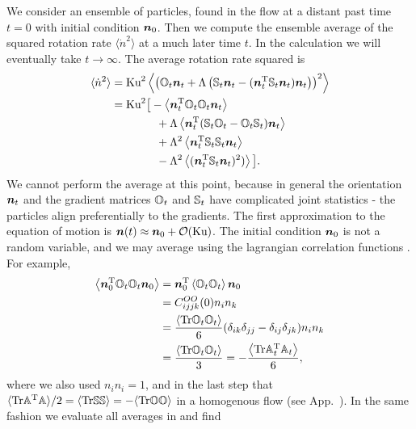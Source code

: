 \documentclass[thesis.tex]{subfiles}
\begin{document}
We consider an ensemble of particles, found in the flow at a distant past time $t=0$ with initial condition $\mbox{\boldmath$n$}_0$. Then we compute the ensemble average of the squared rotation rate $\langle \dot n^2\rangle$ at a much later time $t$.
In the calculation we will eventually take $t\to\infty$. The average rotation rate squared is
\begin{align}
	\langle \dot n^2\rangle &= \ku^2\left\langle\left(\ma O_{t}\ve n_{t}+\Lambda\left(\ma S_{t}\ve n_{t}-(\ve n_{t}\transpose\ma S_{t}\ve n_{t})\ve n_{t}\right)\right)^2\right\rangle\nn \nn\\
	&= \ku^2\big[-\left\langle\ve n_{t}\transpose \ma O_{t} \ma O_{t} \ve n_{t}\right\rangle \nn\\
	&\qquad\qquad+ \Lambda\left\langle\ve n_{t}\transpose(\ma S_{t}\ma O_{t} - \ma O_{t}\ma S_{t})\ve n_t\right\rangle \nn\\
	&\qquad\qquad+ \Lambda^2\left\langle\ve n_{t}\transpose\ma S_{t}\ma S_{t}\ve n_{t}\right\rangle \nn\\
	&\qquad\qquad-  \Lambda^2\left\langle(\ve n_{t}\transpose\ma S_{t}\ve n_{t})^2)\right\rangle\big].\eqnlab{ndotsquared}
\end{align}
We cannot perform the average at this point, because in general the orientation $\mbox{\boldmath$n$}_t$ and the gradient matrices $\mathbb{O}_t$ and $\mathbb{S}_t$ have complicated joint statistics - the particles align preferentially to the gradients. 
The first approximation to the equation of motion  is $\mbox{\boldmath$n$}(t) \approx \mbox{\boldmath$n$}_0 + \mathcal O(\mbox{Ku})$.
The initial condition $\mbox{\boldmath$n$}_0$ is not a random variable, and we may average using the lagrangian correlation functions . For example,
\begin{align*}
 	\left\langle\mbox{\boldmath$n$}_{0}^{\mathrm T} \mathbb{O}_{t} \mathbb{O}_{t} \mbox{\boldmath$n$}_{0}\right\rangle&=\mbox{\boldmath$n$}_{0}^{\mathrm T}\left\langle \mathbb{O}_{t} \mathbb{O}_{t} \right\rangle\mbox{\boldmath$n$}_{0} \\
 	&= C^{OO}_{ijjk}(0)n_in_k\\
 	&= \frac{\left\langle \mbox{Tr} \mathbb{O}_t\mathbb{O}_t\right\rangle}{6}( \delta_{ik}\delta_{jj}-\delta_{ij}\delta_{jk})n_in_k\\
 	&=\frac{\left\langle \mbox{Tr} \mathbb{O}_t\mathbb{O}_t\right\rangle}{3} = -\frac{\left\langle \mbox{Tr} \mathbb{A}_t^{\mathrm T}\mathbb{A}_t\right\rangle}{6},
 \end{align*}
where we also used $n_in_i=1$, and in the last step that $\langle\mbox{Tr}\mathbb{A}^{\mathrm T} \mathbb{A}\rangle/2=\langle\mbox{Tr}\mathbb{S}\mathbb{S}\rangle=-\langle\mbox{Tr}\mathbb{O}\mathbb{O}\rangle$ in a homogenous flow (see App.~). In the same fashion we evaluate all averages in  and find
\end{document}
